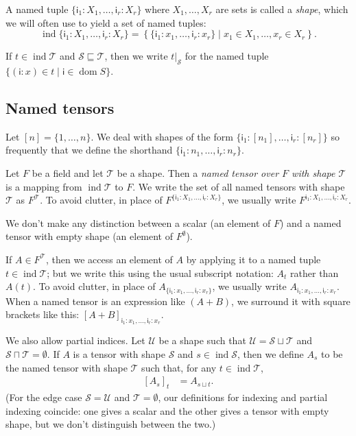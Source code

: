 \documentclass{article}
\newcommand{\name}[1]{\mathsf{#1}}
\newcommand{\tuple}[1]{\{ #1\}}
\DeclareMathOperator{\tupledom}{dom}
\DeclareMathOperator{\tupleshape}{ind}
\newcommand{\tuplerestrict}[2]{\left.#1\right|_{#2}}
\begin{document}
A named tuple $\tuple{\name{i}_1: X_1, \ldots, \name{i}_r: X_r}$ where $X_1, \ldots, X_r$ are sets is called a \emph{shape}, which we will often use to yield a set of named tuples:
\begin{equation*}
\tupleshape \tuple{\name{i}_1: X_1, \ldots, \name{i}_r: X_r} = \left\{\tuple{\name{i}_1: x_1, \ldots, \name{i}_r: x_r} \mid x_1 \in X_1, \ldots, x_r \in X_r\right\}.
\end{equation*}

If $t \in \tupleshape \mathcal{T}$ and $\mathcal{S} \sqsubseteq \mathcal{T}$, then we write $\tuplerestrict{t}{\mathcal{S}}$ for the named tuple $\{(\name{i}: x) \in t \mid \name{i} \in \tupledom{S}\}$.

\subsection{Named tensors}

Let $[n] = \{1, \ldots, n\}$. We deal with shapes of the form $\tuple{\name{i}_1: [n_1], \ldots, \name{i}_r: [n_r]}$ so frequently that we define the shorthand $\tuple{\name{i}_1: n_1, \ldots, \name{i}_r: n_r}$.

Let $F$ be a field and let $\mathcal{T}$ be a shape. Then a \emph{named tensor over $F$ with shape $\mathcal{T}$} is a mapping from $\tupleshape \mathcal{T}$ to $F$. We write the set of all named tensors with shape $\mathcal{T}$ as $F^{\mathcal{T}}$. To avoid clutter, in place of $F^{\tuple{\name{i}_1: X_1, \ldots, \name{i}_r: X_r}}$, we usually write $F^{\name{i}_1: X_1, \ldots, \name{i}_r: X_r}$.

We don't make any distinction between a scalar (an element of $F$) and a named tensor with empty shape (an element of $F^\emptyset$).

If $A \in F^{\mathcal{T}}$, then we access an element of $A$ by applying it to a named tuple $t \in \tupleshape\mathcal{T}$; but we write this using the usual subscript notation: $A_t$ rather than $A(t)$. To avoid clutter, in place of $A_{\tuple{\name{i}_1: x_1, \ldots, \name{i}_r: x_r}}$, we usually write $A_{\name{i}_1: x_1, \ldots, \name{i}_r: x_r}$. When a named tensor is an expression like $(A+B)$, we surround it with square brackets like this: $[A+B]_{\name{i}_1: x_1, \ldots, \name{i}_r: x_r}$.

We also allow partial indices. Let $\mathcal{U}$ be a shape such that $\mathcal{U} = \mathcal{S} \sqcup \mathcal{T}$ and $\mathcal{S} \sqcap \mathcal{T} = \emptyset$.
If $A$ is a tensor with shape $\mathcal{S}$ and $s \in \tupleshape \mathcal{S}$, then we define $A_s$ to be the named tensor with shape $\mathcal{T}$ such that, for any $t \in \tupleshape \mathcal{T}$,
\begin{align*}
\left[A_s\right]_t &= A_{s \sqcup t}.
\end{align*}
(For the edge case $\mathcal{S} = \mathcal{U}$ and $\mathcal{T} = \emptyset$, our definitions for indexing and partial indexing coincide: one gives a scalar and the other gives a tensor with empty shape, but we don't distinguish between the two.)
\end{document}
